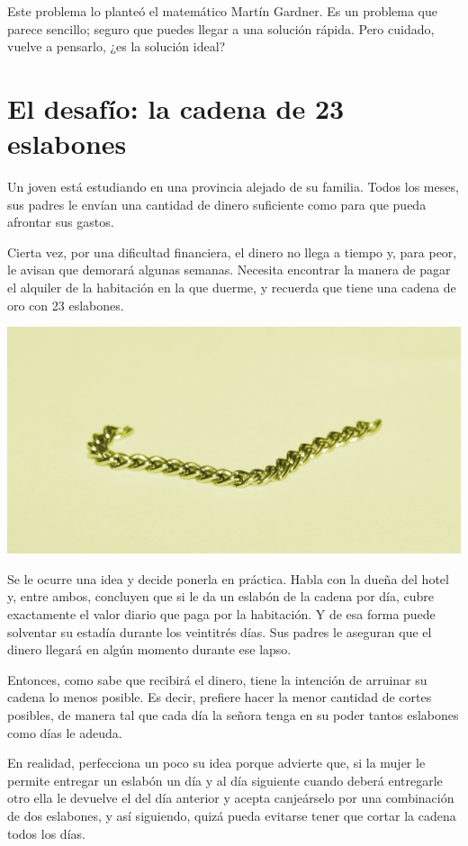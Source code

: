 \begin{multicols}{2}
\cappar Este problema lo planteó el matemático Martín Gardner. Es un
problema que parece sencillo; seguro que puedes llegar a una
solución rápida. Pero cuidado, vuelve a pensarlo, ¿es la solución
ideal?
\section*{El desafío: la cadena de 23 eslabones}
Un joven está estudiando en una provincia alejado de su familia.
Todos los meses, sus padres le envían una cantidad de dinero suficiente
como para que pueda afrontar sus gastos.

Cierta vez, por una dificultad financiera, el dinero no llega a
tiempo y, para peor, le avisan que demorará algunas semanas. Necesita
encontrar la manera de pagar el alquiler de la habitación
en la que duerme, y recuerda que tiene una cadena de oro con 23
eslabones.
\begin{center}
  \includegraphics[width=\linewidth]{cadena23.png}
\end{center}
Se le ocurre una idea y decide ponerla en práctica. Habla con
la dueña del hotel y, entre ambos, concluyen que si le da un eslabón
de la cadena por día, cubre exactamente el valor diario que
paga por la habitación. Y de esa forma puede solventar su estadía
durante los veintitrés días. Sus padres le aseguran que el dinero
llegará en algún momento durante ese lapso.

Entonces, como sabe que recibirá el dinero, tiene la intención
de arruinar su cadena lo menos posible. Es decir, prefiere
hacer la menor cantidad de cortes posibles, de manera tal que
cada día la señora tenga en su poder tantos eslabones como días
le adeuda.

En realidad, perfecciona un poco su idea porque advierte que,
si la mujer le permite entregar un eslabón un día y al día siguiente
cuando deberá entregarle otro ella le devuelve el del día anterior
y acepta canjeárselo por una combinación de dos eslabones,
y así siguiendo, quizá pueda evitarse tener que cortar la cadena
todos los días.


\end{multicols}
